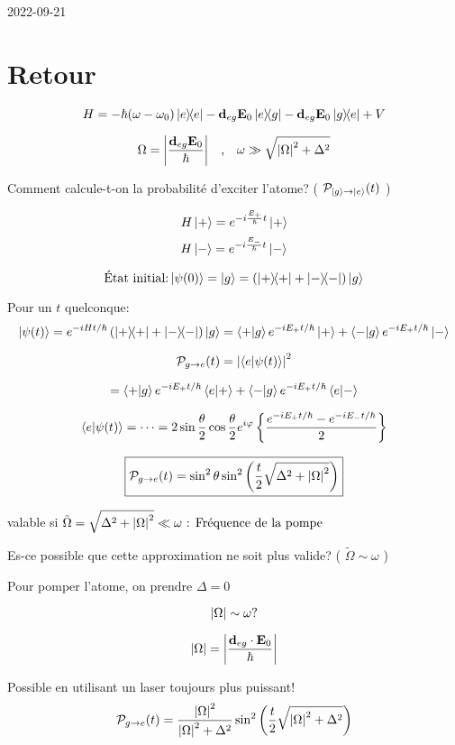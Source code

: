 


2022-09-21
\section*{Retour}

$$H= -\hbar (\omega-\omega_{0}) \op e  -\vb{d}_{eg} \vb{E}_0 \op{e}{g} - \vb{d}_{eg} \vb{E}_0 \op{g}{e} + V$$ 


$$\Omega =\abs{\frac{\vb{d}_{eg}\vb{E}_0}{\hbar} } \qq{,} \omega \gg \sqrt{\abs{\Omega}^2 + \Delta^2 }$$ 

Comment calcule-t-on la probabilité d'exciter l'atome? ( $\mathcal{P}_{\ket{g}\to\ket{e}}(t) $  )



$$H \ket{+} = e^{-i \frac{E_+}{\hbar} t} \ket{+}$$ 
$$H \ket{-} = e^{-i \frac{E_-}{\hbar} t} \ket{-}$$ 

$$\text{État initial:} \ket{\psi(0)}=\ket{g} = \left( \op + + \op - \right) \ket{g}$$ 

Pour un $t$ quelconque: $$\ket{\psi(t)}=  e^{-i Ht/\hbar} \left( \op + + \op- \right) \ket{g} = \ip{+}{g}e^{-i E_+ t/\hbar} \ket{+} + \ip{-}{g}e^{-iE_+ t/\hbar} \ket{-}$$  

$$\mathcal{P} _{g \to e} (t) = \abs{\ip{e}{\psi(t)}}^{2}$$ 


$$= \ip{+}{g}e^{-i E_+ t/\hbar} \bra{e}\ket{+} + \ip{-}{g}e^{-iE_+ t/\hbar} \bra{e}\ket{-}$$ 

$$\ip{e}{\psi(t)} = \dotsb = 2\sin \frac{\theta}{2} \cos \frac{\theta}{2} e^{i \varphi} \left\{ \frac{e^{-iE_+ t /\hbar} - e^{-i E_- t/\hbar}}{2}  \right\} $$ 

$$\boxed{ \mathcal{P} _{g\to e}(t) = \sin^{2}\theta \sin^{2}\left( \frac{t}{2} \sqrt{\Delta^{2} + \abs{\Omega}^2 } \right)  }$$ 

valable si $\tilde \Omega = \sqrt{\Delta^{2}+ \abs{\Omega}^{2}}\ll \omega \text{ : Fréquence de la pompe } $ 


Es-ce possible que cette approximation ne soit plus valide? ( $\tilde \Omega \sim \omega$  ) 

Pour pomper l'atome, on prendre $\Delta = 0$ 

$$\abs{\Omega} \sim \omega ?$$ 

$$\abs{\Omega} = \abs{\frac{\vb{d}_{eg} \cdot \vb{E}_0}{\hbar} }  $$ 

Possible en utilisant un laser toujours plus puissant!
$$\mathcal{P} _{g\to e} (t) = \frac{\abs{\Omega}^{2}}{\abs{\Omega}^{2}+\Delta^2} \sin^{2}\left( \frac{t}{2} \sqrt{\abs{\Omega}^2 + \Delta^2 } \right)  $$ 

